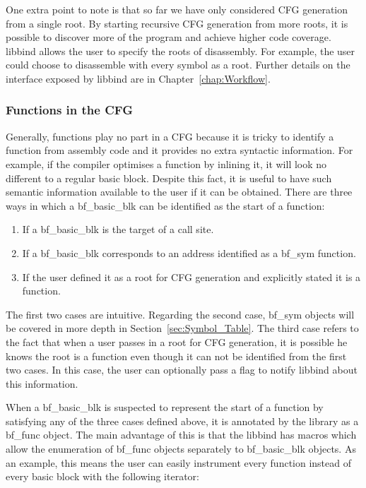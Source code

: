 One extra point to note is that so far we have only considered CFG generation from a single root. By starting recursive CFG generation from more roots, it is possible to discover more of the program and achieve higher code coverage. libbind allows the user to specify the roots of disassembly. For example, the user could choose to disassemble with every symbol as a root. Further details on the interface exposed by libbind are in Chapter~\ref{chap:Workflow}.

\subsubsection{Functions in the CFG}

Generally, functions play no part in a CFG because it is tricky to identify a function from assembly code and it provides no extra syntactic information. For example, if the compiler optimises a function by inlining it, it will look no different to a regular basic block. Despite this fact, it is useful to have such semantic information available to the user if it can be obtained. There are three ways in which a bf\_basic\_blk can be identified as the start of a function:

\begin{enumerate}
\item If a bf\_basic\_blk is the target of a call site.
\item If a bf\_basic\_blk corresponds to an address identified as a bf\_sym function.
\item If the user defined it as a root for CFG generation and explicitly stated it is a function.
\end{enumerate}

The first two cases are intuitive. Regarding the second case, bf\_sym objects will be covered in more depth in Section~\ref{sec:Symbol_Table}. The third case refers to the fact that when a user passes in a root for CFG generation, it is possible he knows the root is a function even though it can not be identified from the first two cases. In this case, the user can optionally pass a flag to notify libbind about this information.

When a bf\_basic\_blk is suspected to represent the start of a function by satisfying any of the three cases defined above, it is annotated by the library as a bf\_func object. The main advantage of this is that the libbind has macros which allow the enumeration of bf\_func objects separately to bf\_basic\_blk objects. As an example, this means the user can easily instrument every function instead of every basic block with the following iterator:

